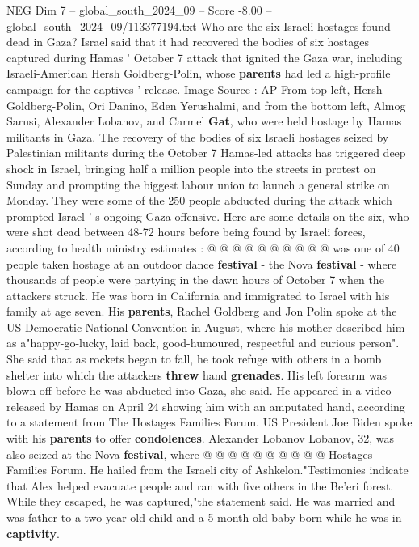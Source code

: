 \begin{textsample}{NEG Dim 7 – global\_south\_2024\_09 – Score -8.00 – global\_south\_2024\_09/113377194.txt}  \label{ex:f7_neg_178}
Who are the six Israeli hostages found dead in Gaza?
Israel said that it had recovered the bodies of six hostages captured during Hamas ' October 7 attack that ignited the Gaza war, including Israeli-American Hersh Goldberg-Polin, whose \textbf{parents} had led a high-profile campaign for the captives ' release.
Image Source : AP From top left, Hersh Goldberg-Polin, Ori Danino, Eden Yerushalmi, and from the bottom left, Almog Sarusi, Alexander Lobanov, and Carmel \textbf{Gat}, who were held hostage by Hamas militants in Gaza.
The recovery of the bodies of six Israeli hostages seized by Palestinian militants during the October 7 Hamas-led attacks has triggered deep shock in Israel, bringing half a million people into the streets in protest on Sunday and prompting the biggest labour union to launch a general strike on Monday.
They were some of the 250 people abducted during the attack which prompted Israel ' s ongoing Gaza offensive.
Here are some details on the six, who were shot dead between 48-72 hours before being found by Israeli forces, according to health ministry estimates : @ @ @ @ @ @ @ @ @ @ was one of 40 people taken hostage at an outdoor dance \textbf{festival} - the Nova \textbf{festival} - where thousands of people were partying in the dawn hours of October 7 when the attackers struck.
He was born in California and immigrated to Israel with his family at age seven.
His \textbf{parents}, Rachel Goldberg and Jon Polin spoke at the US Democratic National Convention in August, where his mother described him as a"happy-go-lucky, laid back, good-humoured, respectful and curious person".
She said that as rockets began to fall, he took refuge with others in a bomb shelter into which the attackers \textbf{threw} hand \textbf{grenades}.
His left forearm was blown off before he was abducted into Gaza, she said.
He appeared in a video released by Hamas on April 24 showing him with an amputated hand, according to a statement from The Hostages Families Forum.
US President Joe Biden spoke with his \textbf{parents} to offer \textbf{condolences}.
Alexander Lobanov Lobanov, 32, was also seized at the Nova \textbf{festival}, where @ @ @ @ @ @ @ @ @ @ Hostages Families Forum.
He hailed from the Israeli city of Ashkelon."Testimonies indicate that Alex helped evacuate people and ran with five others in the Be'eri forest.
While they escaped, he was captured,"the statement said.
He was married and was father to a two-year-old child and a 5-month-old baby born while he was in \textbf{captivity}.

\end{textsample}
